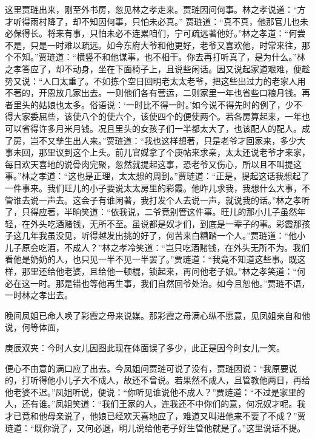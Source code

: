 \begin{parag}
    这里贾琏出来，刚至外书房，忽见林之孝走来。贾琏因问何事。林之孝说道：“方才听得雨村降了，却不知因何事，只怕未必真。” 贾琏道：“真不真，他那官儿也未必保得长。将来有事，只怕未必不连累咱们，宁可疏远著他好。”林之孝道：“何尝不是，只是一时难以疏远。如今东府大爷和他更好，老爷又喜欢他，时常来往，那个不知。”贾琏道：“横竖不和他谋事，也不相干。你去再打听真了，是为什么。”林之孝答应了，却不动身，坐在下面椅子上，且说些闲话。因又说起家道艰难，便趁势又说：“人口太重了。不如拣个空日回明老太太老爷，把这些出过力的老家人用不著的，开恩放几家出去。一则他们各有营运，二则家里一年也省些口粮月钱。再者里头的姑娘也太多。俗语说：‘一时比不得一时。’如今说不得先时的例了，少不得大家委屈些，该使八个的使六个，该使四个的便使两个。若各房算起来，一年也可以省得许多月米月钱。况且里头的女孩子们一半都太大了，也该配人的配人。成了房，岂不又孳生出人来。”贾琏道：“我也这样想著，只是老爷才回家来，多少大事未回，那里议到这个上头。前儿官媒拿了个庚帖来求亲，太太还说老爷才来家，每日欢天喜地的说骨肉完聚，忽然就提起这事，恐老爷又伤心，所以且不叫提这事。”林之孝道：“这也是正理，太太想的周到。”贾琏道：“正是，提起这话我想起了一件事来。我们旺儿的小子要说太太房里的彩霞。他昨儿求我，我想什么大事，不管谁去说一声去。这会子有谁闲著，我打发个人去说一声，就说我的话。”林之孝听了，只得应著，半晌笑道：“依我说，二爷竟别管这件事。旺儿的那小儿子虽然年轻，在外头吃酒赌钱，无所不至。虽说都是奴才们，到底是一辈子的事。彩霞那孩子这几年我虽没见，听得越发出挑的好了，何苦来白糟踏一个人。”贾琏道：“他小儿子原会吃酒，不成人？”林之孝冷笑道：“岂只吃酒赌钱，在外头无所不为。我们看他是奶奶的人，也只见一半不见一半罢了。”贾琏道：“我竟不知道这些事。既这样，那里还给他老婆，且给他一顿棍，锁起来，再问他老子娘。”林之孝笑道：“何必在这一时。那是错也等他再生事，我们自然回爷处治。如今且恕他。”贾琏不语，一时林之孝出去。
\end{parag}


\begin{parag}
    晚间凤姐已命人唤了彩霞之母来说媒。那彩霞之母满心纵不愿意，见凤姐亲自和他说，何等体面，\begin{note}庚辰双夹：今时人女儿因图此现在体面误了多少，此正是因今时女儿一笑。\end{note}便心不由意的满口应了出去。今凤姐问贾琏可说了没有，贾琏因说：“我原要说的，打听得他小儿子大不成人，故还不曾说。若果然不成人，且管教他两日，再给他老婆不迟。”凤姐听说，便说：“你听见谁说他不成人？”贾琏道：“不过是家里的人，还有谁。”凤姐笑道：“我们王家的人，连我还不中你们的意，何况奴才呢。我才已竟和他母亲说了，他娘已经欢天喜地应了，难道又叫进他来不要了不成？”贾琏道：“既你说了，又何必退，明儿说给他老子好生管他就是了。”这里说话不提。
\end{parag}


